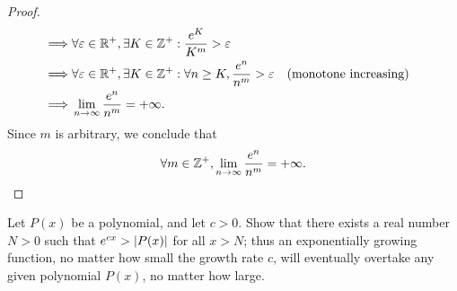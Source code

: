 \begin{proof}
\begin{align*}
    \implies & \forall \varepsilon \in \mathbb{R}^+, \exists K \in \mathbb{Z}^+ : \dfrac{e^K}{K^m} > \varepsilon                                                                              \\
    \implies & \forall \varepsilon \in \mathbb{R}^+, \exists K \in \mathbb{Z}^+ : \forall n \geq K, \dfrac{e^n}{n^m} > \varepsilon                          &  & \text{(monotone increasing)} \\
    \implies & \lim_{n \to \infty} \dfrac{e^n}{n^m} = +\infty.
  \end{align*}
  Since \(m\) is arbitrary, we conclude that
  \[
    \forall m \in \mathbb{Z}^+, \lim_{n \to \infty} \dfrac{e^n}{n^m} = +\infty.
  \]
\end{proof}

\begin{ex}\label{ex:4.5.9}
  Let \(P(x)\) be a polynomial, and let \(c > 0\).
  Show that there exists a real number \(N > 0\) such that \(e^{cx} > \left\lvert P(x)\right\rvert\) for all \(x > N\);
  thus an exponentially growing function, no matter how small the growth rate \(c\), will eventually overtake any given polynomial \(P(x)\), no matter how large.
\end{ex}

